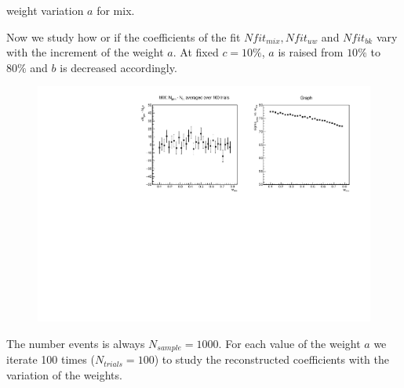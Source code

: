 \documentclass[9pt]{beamer}
\begin{document}
\begin{frame}{weight variation $a$ for mix.}

Now we study how or if the coefficients of the fit $Nfit_{mix}, Nfit_{uw}$ and $Nfit_{bk}$ vary with the increment of the weight $a$. 
At fixed $c = 10\%$, $a$ is raised from $10\%$ to $80\%$ and $b$ is decreased accordingly. 

\begin{figure}
\vspace{-7pt}
\includegraphics[width = 1\textwidth , valign = t]{N1000/Nmix_and_Sigma(80,10,10).pdf}
\end{figure}
The number events is always $ N_{sample} = 1000$. For each value of the weight $a$  we\\ iterate 100 times ($N_{trials} = 100$) to study the reconstructed coefficients with the \\ variation of the weights.
\end{frame}
\end{document}
